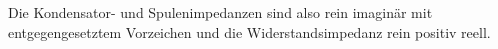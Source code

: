 % 
% 

Die Kondensator- und Spulenimpedanzen sind also rein imaginär mit entgegengesetztem Vorzeichen und die Widerstandsimpedanz rein positiv reell.

